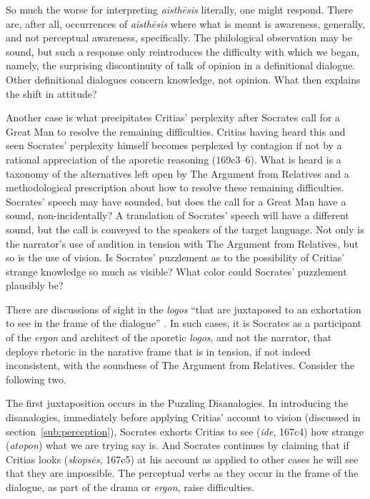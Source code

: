 So much the worse for interpreting \emph{aisthēsis} literally, one might respond. There are, after all, occurrences of \emph{aisthēsis} where what is meant is awareness, generally, and not perceptual awareness, specifically. The philological observation may be sound, but such a response only reintroduces the difficulty with which we began, namely, the surprising discontinuity of talk of opinion in a definitional dialogue. Other definitional dialogues concern knowledge, not opinion. What then explains the shift in attitude?

Another case is what precipitates Critias' perplexity after Socrates call for a Great Man to resolve the remaining difficulties. Critias having heard this and seen Socrates' perplexity himself becomes perplexed by contagion if not by a rational appreciation of the aporetic reasoning (169c3–6). What is heard is a taxonomy of the alternatives left open by The Argument from Relatives and a methodological prescription about how to resolve these remaining difficulties. Socrates' speech may have sounded, but does the call for a Great Man have a sound, non-incidentally? A translation of Socrates' speech will have a different sound, but the call is conveyed to the speakers of the target language. Not only is the narrator's use of audition in tension with The Argument from Relatives, but so is the use of vision. Is Socrates' puzzlement as to the possibility of Critias' strange knowledge so much as visible? What color could Socrates' puzzlement plausibly be?

There are discussions of sight in the \emph{logos} ``that are juxtaposed to an exhortation to see in the frame of the dialogue'' \citep[9]{McCabe:2007ss}. In such cases, it is Socrates as a participant of the \emph{ergon} and architect of the aporetic \emph{logos}, and not the narrator, that deploys rhetoric in the narative frame that is in tension, if not indeed inconsistent, with the soundness of The Argument from Relatives. Consider the following two.

The first juxtaposition occurs in the Puzzling Disanalogies. In introducing the disanalogies, immediately before applying Critias' account to vision (discussed in section~\ref{sub:perception}), Socrates exhorts Critias to see (\emph{ide}, 167c4) how strange (\emph{atopon}) what we are trying say is. And Socrates continues by claiming that if Critias looks (\emph{skopsēs}, 167c5) at his account as applied to other cases he will see that they are impossible. The perceptual verbs as they occur in the frame of the dialogue, as part of the drama or \emph{ergon}, raise difficulties. 

